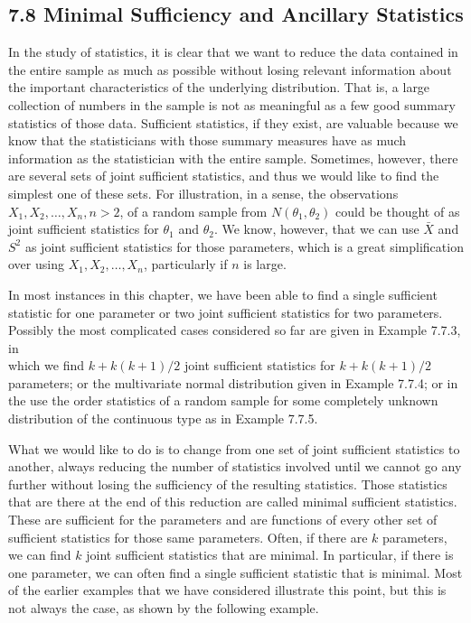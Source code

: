 \subsection*{7.8 Minimal Sufficiency and Ancillary Statistics}
In the study of statistics, it is clear that we want to reduce the data contained in the entire sample as much as possible without losing relevant information about the important characteristics of the underlying distribution. That is, a large collection of numbers in the sample is not as meaningful as a few good summary statistics of those data. Sufficient statistics, if they exist, are valuable because we know that the statisticians with those summary measures have as much information as the statistician with the entire sample. Sometimes, however, there are several sets of joint sufficient statistics, and thus we would like to find the simplest one of these sets. For illustration, in a sense, the observations $X_{1}, X_{2}, \ldots, X_{n}, n>2$, of a random sample from $N\left(\theta_{1}, \theta_{2}\right)$ could be thought of as joint sufficient statistics for $\theta_{1}$ and $\theta_{2}$. We know, however, that we can use $\bar{X}$ and $S^{2}$ as joint sufficient statistics for those parameters, which is a great simplification over using $X_{1}, X_{2}, \ldots, X_{n}$, particularly if $n$ is large.

In most instances in this chapter, we have been able to find a single sufficient statistic for one parameter or two joint sufficient statistics for two parameters. Possibly the most complicated cases considered so far are given in Example 7.7.3, in\\
which we find $k+k(k+1) / 2$ joint sufficient statistics for $k+k(k+1) / 2$ parameters; or the multivariate normal distribution given in Example 7.7.4; or in the use the order statistics of a random sample for some completely unknown distribution of the continuous type as in Example 7.7.5.

What we would like to do is to change from one set of joint sufficient statistics to another, always reducing the number of statistics involved until we cannot go any further without losing the sufficiency of the resulting statistics. Those statistics that are there at the end of this reduction are called minimal sufficient statistics. These are sufficient for the parameters and are functions of every other set of sufficient statistics for those same parameters. Often, if there are $k$ parameters, we can find $k$ joint sufficient statistics that are minimal. In particular, if there is one parameter, we can often find a single sufficient statistic that is minimal. Most of the earlier examples that we have considered illustrate this point, but this is not always the case, as shown by the following example.

